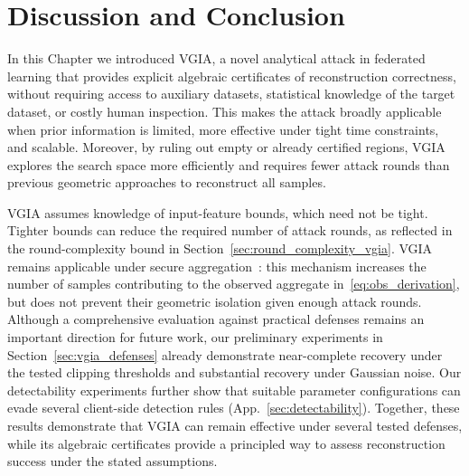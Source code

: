 \section{Discussion and Conclusion}
In this Chapter we introduced VGIA, a novel analytical attack in federated learning that provides explicit algebraic certificates of reconstruction correctness, without requiring access to auxiliary datasets, statistical knowledge of the target dataset, or costly human inspection. This makes the attack broadly applicable when prior information is limited, more effective under tight time constraints, and scalable. Moreover, by ruling out empty or already certified regions, VGIA explores the search space more efficiently and requires fewer attack rounds than previous geometric approaches to reconstruct all samples.

VGIA assumes knowledge of input-feature bounds, which need not be tight. Tighter bounds can reduce the required number of attack rounds, as reflected in the round-complexity bound in Section~\ref{sec:round_complexity_vgia}.
VGIA remains applicable under secure aggregation~:  this mechanism increases the number of samples contributing to the observed aggregate in~\eqref{eq:obs_derivation}, but does not prevent their geometric isolation given enough attack rounds.
Although a comprehensive evaluation against practical defenses remains an important direction for future work, our preliminary experiments in Section~\ref{sec:vgia_defenses} already demonstrate near-complete recovery under the tested clipping thresholds and substantial recovery under Gaussian noise.
Our detectability experiments further show that suitable parameter configurations can evade several client-side detection rules (App.~\ref{sec:detectability}).
Together, these results demonstrate that VGIA can remain effective under several tested defenses, while its algebraic certificates provide a principled way to assess reconstruction success under the stated assumptions.
